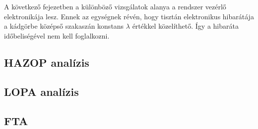\chapter{\analysis}\label{chap:analysis}
A következő fejezetben a különböző vizsgálatok alanya a rendszer vezérlő elektronikája lesz.
Ennek az egységnek révén, hogy tisztán elektronikus hibarátája a kádgörbe középső szakaszán konstans $\lambda$ értékkel közelíthető.
Így a hibaráta időbeliségével nem kell foglalkozni.

\section{HAZOP analízis}

\section{LOPA analízis}

\section{FTA}